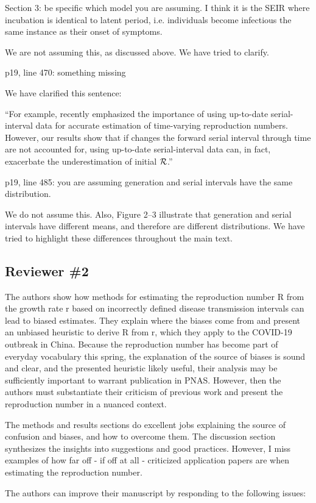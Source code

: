\documentclass[12pt]{article}
\newcommand{\RR}{\ensuremath{{\cal R}}}
\newcommand{\rev}{\subsection*}
\newcommand{\revtext}{\textsf}
\begin{document}
\revtext{Section 3: be specific which model you are assuming. I think it is the SEIR where incubation is identical to latent period, i.e. individuals become infectious the same instance as their onset of symptoms.}

We are not assuming this, as discussed above. We have tried to clarify.

\revtext{p19, line 470: something missing}

We have clarified this sentence:

``For example, \cite{thompson2019improved} recently emphasized the importance of using up-to-date serial-interval data for accurate estimation of time-varying reproduction numbers.
However, our results show that if changes the forward serial interval through time are not accounted for, using up-to-date serial-interval data can, in fact, exacerbate the underestimation of initial \RR.''

\revtext{p19, line 485: you are assuming generation and serial intervals have the same distribution.}

We do not assume this. Also, Figure 2--3 illustrate that generation and serial intervals have different means, and therefore are different distributions. We have tried to highlight these differences throughout the main text.

\rev{Reviewer \#2}

\revtext{The authors show how methods for estimating the reproduction number R from the growth rate r based on incorrectly defined disease transmission intervals can lead to biased estimates. They explain where the biases come from and present an unbiased heuristic to derive R from r, which they apply to the COVID-19 outbreak in China. Because the reproduction number has become part of everyday vocabulary this spring, the explanation of the source of biases is sound and clear, and the presented heuristic likely useful, their analysis may be sufficiently important to warrant publication in PNAS. However, then the authors must substantiate their criticism of previous work and present the reproduction number in a nuanced context.}

\revtext{The methods and results sections do excellent jobs explaining the source of confusion and biases, and how to overcome them. The discussion section synthesizes the insights into suggestions and good practices. However, I miss examples of how far off - if off at all - criticized application papers are when estimating the reproduction number.}

\revtext{The authors can improve their manuscript by responding to the following issues:}
\end{document}
